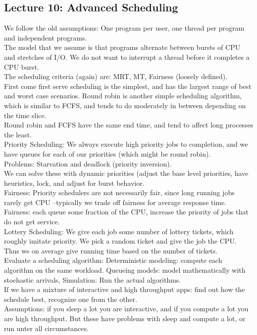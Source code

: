 \documentclass[paper=a4, fontsize=11pt]{scrartcl} %
\numberwithin{equation}{section} %
\numberwithin{figure}{section} %
\numberwithin{table}{section} %
\begin{document}
\subsection{Lecture 10: Advanced Scheduling}
We follow the old assumptions: One program per user, one thread per program and independent programs. \\
The model that we assume is that programs alternate between bursts of CPU and stretches of I/O. We do not want to interrupt a thread before it completes a CPU burst. \\
The scheduling criteria (again) are: MRT, MT, Fairness (loosely defined). \\
First come first serve scheduling is the simplest, and has the largest range of best and worst case scenarios. Round robin is another simple scheduling algorithm, which is similar to FCFS, and tends to do moderately in between depending on the time slice. \\
Round robin and FCFS have the same end time, and tend to affect long processes the least. \\
Priority Scheduling: We always execute high priority jobs to completion, and we have queues for each of our priorities (which might be round robin). \\
Problems: Starvation and deadlock (priority inversion). \\
We can solve these with dynamic priorities (adjust the base level priorities, have heuristics, lock, and adjust for burst behavior.\\
Fairness: Priority schedulers are not necessarily fair, since long running jobs rarely get CPU --typically we trade off fairness for average response time. \\
Fairness: each queue some fraction of the CPU, increase the priority of jobs that do not get service. \\
Lottery Scheduling: We give each job some number of lottery tickets, which roughly imitate priority. We pick a random ticket and give the job the CPU. Thus we on average give running time based on the number of tickets. \\
Evaluate a scheduling algorithm: Deterministic modeling: compute each algorithm on the same workload. Queueing models: model mathematically with stochastic arrivals, Simulation: Run the actual algorithms. \\
If we have a mixture of interactive and high throughput apps: find out how the schedule best, recognize one from the other. \\
Assumptions: if you sleep a lot you are interactive, and if you compute a lot you are high throughput. But these have problems with sleep and compute a lot, or run unter all circumstances. \\
\end{document}
